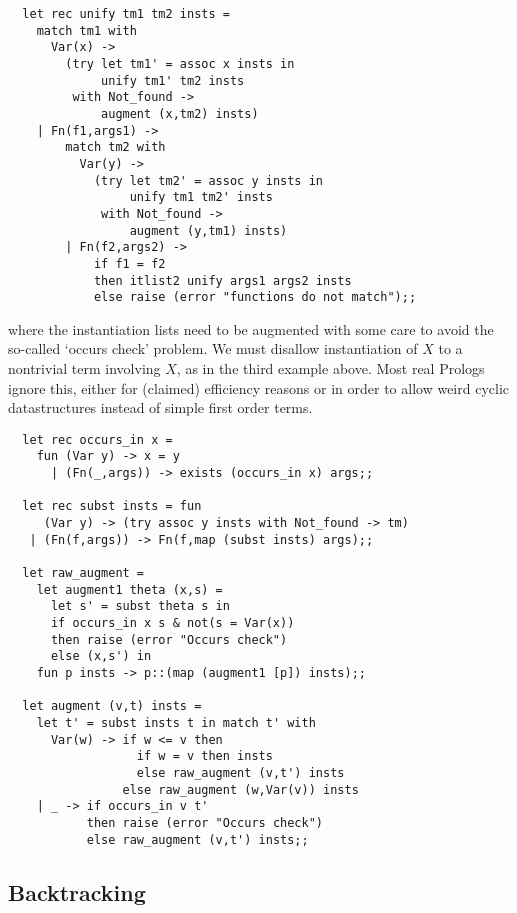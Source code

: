 \begin{boxed}\begin{lstlisting}
  let rec unify tm1 tm2 insts =
    match tm1 with
      Var(x) ->
        (try let tm1' = assoc x insts in
             unify tm1' tm2 insts
         with Not_found ->
             augment (x,tm2) insts)
    | Fn(f1,args1) ->
        match tm2 with
          Var(y) ->
            (try let tm2' = assoc y insts in
                 unify tm1 tm2' insts
             with Not_found ->
                 augment (y,tm1) insts)
        | Fn(f2,args2) ->
            if f1 = f2
            then itlist2 unify args1 args2 insts
            else raise (error "functions do not match");;
\end{lstlisting}\end{boxed}

\noindent where the instantiation lists need to be augmented with some care to
avoid the so-called `occurs check' problem. We must disallow instantiation of
$X$ to a nontrivial term involving $X$, as in the third example above. Most
real Prologs ignore this, either for (claimed) efficiency reasons or in order
to allow weird cyclic datastructures instead of simple first order terms.

\begin{boxed}\begin{lstlisting}
  let rec occurs_in x =
    fun (Var y) -> x = y
      | (Fn(_,args)) -> exists (occurs_in x) args;;

  let rec subst insts = fun
     (Var y) -> (try assoc y insts with Not_found -> tm)
   | (Fn(f,args)) -> Fn(f,map (subst insts) args);;

  let raw_augment =
    let augment1 theta (x,s) =
      let s' = subst theta s in
      if occurs_in x s & not(s = Var(x))
      then raise (error "Occurs check")
      else (x,s') in
    fun p insts -> p::(map (augment1 [p]) insts);;

  let augment (v,t) insts =
    let t' = subst insts t in match t' with
      Var(w) -> if w <= v then
                  if w = v then insts
                  else raw_augment (v,t') insts
                else raw_augment (w,Var(v)) insts
    | _ -> if occurs_in v t'
           then raise (error "Occurs check")
           else raw_augment (v,t') insts;;
\end{lstlisting}\end{boxed}

\subsection{Backtracking}

